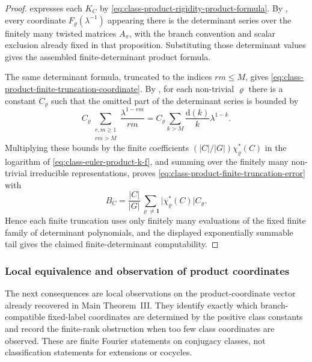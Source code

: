 \documentclass[11pt,a4paper]{amsart}
\theoremstyle{plain}
\theoremstyle{definition}
\theoremstyle{remark}
\newcommand{\abs}[1]{\lvert #1 \rvert}
\begin{document}
\begin{proof}
   expresses each \(K_C\) by
  \eqref{eq:class-product-rigidity-product-formula}.  By
  , every coordinate
  \(F_\varrho(\lambda^{-1})\) appearing there is the determinant series over
  the finitely many twisted matrices \(A_\pi\), with the branch convention and
  scalar exclusion already fixed in that proposition.  Substituting those
  determinant values gives the assembled finite-determinant product formula.

  The same determinant formula, truncated to the indices \(rm\le M\), gives
  \eqref{eq:class-product-finite-truncation-coordinate}.  By
  , for each non-trivial
  \(\varrho\) there is a constant \(C_\varrho\) such that the omitted part of
  the determinant series is bounded by
  \[
    C_\varrho
    \sum_{\substack{r,m\ge1\\rm>M}}\frac{\lambda^{1-rm}}{rm}
    =
    C_\varrho
    \sum_{k>M}\frac{\mathrm d(k)}{k}\lambda^{1-k}.
  \]
  Multiplying these bounds by the finite coefficients
  \((|C|/|G|)\chi_\varrho^\ast(C)\) in the logarithm of
  \eqref{eq:class-euler-product-k-f}, and summing over the finitely many
  non-trivial irreducible representations, proves
  \eqref{eq:class-product-finite-truncation-error} with
  \[
    B_C=\frac{|C|}{|G|}
    \sum_{\varrho\ne\mathbf1}
      \abs{\chi_\varrho^\ast(C)}C_\varrho .
  \]
  Hence each finite truncation uses only finitely many evaluations of the
  fixed finite family of determinant polynomials, and the displayed
  exponentially summable tail gives the claimed finite-determinant
  computability.
\end{proof}

\subsubsection{Local equivalence and observation of product coordinates}
\label{subsubsec:class-product-local-observation}

The next consequences are local observations on the product-coordinate vector
already recovered in Main Theorem~III.  They identify exactly which
branch-compatible fixed-label coordinates are determined by the positive class
constants and record the finite-rank obstruction when too few class coordinates
are observed.  These are finite Fourier statements on conjugacy classes, not
classification statements for extensions or cocycles.
\end{document}
